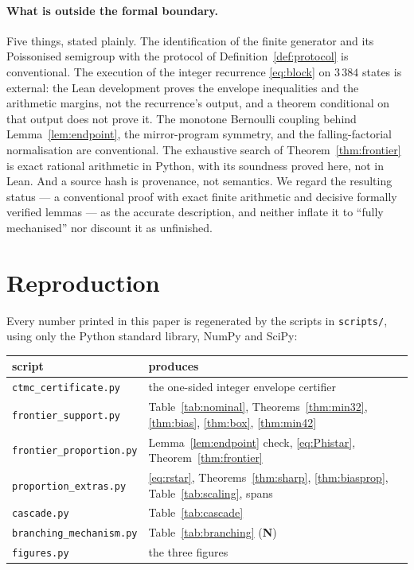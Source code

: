 \documentclass[11pt]{article}
\theoremstyle{plain}
\theoremstyle{definition}
\theoremstyle{remark}
\begin{document}
\paragraph{What is outside the formal boundary.} Five things, stated plainly.
The identification of the finite generator and its Poissonised semigroup with
the protocol of Definition~\ref{def:protocol} is conventional. The execution
of the integer recurrence \eqref{eq:block} on $3\,384$ states is external: the
Lean development proves the envelope inequalities and the arithmetic margins,
not the recurrence's output, and a theorem conditional on that output does not
prove it. The monotone Bernoulli coupling behind Lemma~\ref{lem:endpoint}, the
mirror-program symmetry, and the falling-factorial normalisation are
conventional. The exhaustive search of Theorem~\ref{thm:frontier} is exact
rational arithmetic in Python, with its soundness proved here, not in Lean.
And a source hash is provenance, not semantics. We regard the resulting status
--- a conventional proof with exact finite arithmetic and decisive formally
verified lemmas --- as the accurate description, and neither inflate it to
``fully mechanised'' nor discount it as unfinished.

\section{Reproduction}\label{sec:repro}

Every number printed in this paper is regenerated by the scripts in
\texttt{scripts/}, using only the Python standard library, NumPy and SciPy:

\begin{center}\small
\begin{tabular}{ll}
\toprule
script & produces\\
\midrule
\texttt{ctmc\_certificate.py} & the one-sided integer envelope certifier\\
\texttt{frontier\_support.py} & Table~\ref{tab:nominal},
Theorems~\ref{thm:min32}, \ref{thm:bias}, \ref{thm:box}, \ref{thm:min42}\\
\texttt{frontier\_proportion.py} & Lemma~\ref{lem:endpoint} check,
\eqref{eq:Phistar}, Theorem~\ref{thm:frontier}\\
\texttt{proportion\_extras.py} & \eqref{eq:rstar},
Theorems~\ref{thm:sharp}, \ref{thm:biasprop}, Table~\ref{tab:scaling}, spans\\
\texttt{cascade.py} & Table~\ref{tab:cascade}\\
\texttt{branching\_mechanism.py} & Table~\ref{tab:branching} (\textbf{N})\\
\texttt{figures.py} & the three figures\\
\bottomrule
\end{tabular}
\end{center}
\end{document}
